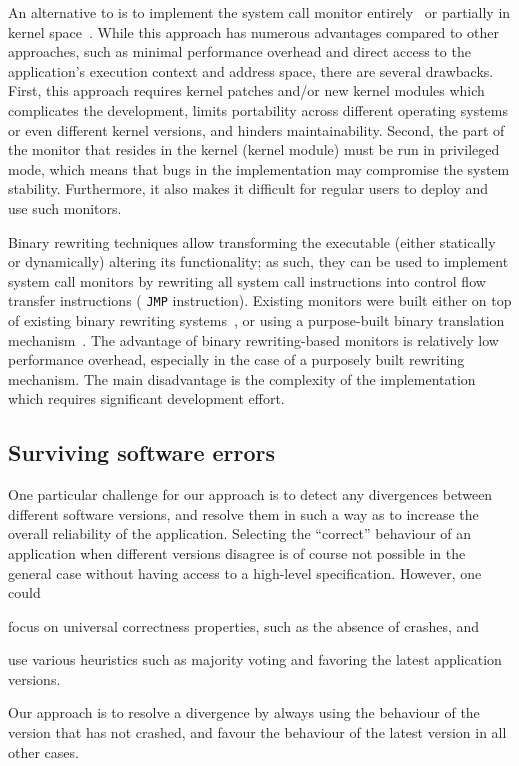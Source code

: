 An alternative to \ptrace is to implement the system call monitor
entirely~\cite{provos2002,cox2006} or partially in kernel space~\cite{ostia}.
While this approach has numerous advantages compared to other approaches, such
as minimal performance overhead and direct access to the application's
execution context and address space, there are several drawbacks.  First, this
approach requires kernel patches and/or new kernel modules which complicates
the development, limits portability across different operating systems or even
different kernel versions, and hinders maintainability. Second, the part of the
monitor that resides in the kernel (\ie kernel module) must be run in
privileged mode, which means that bugs in the implementation may compromise the
system stability. Furthermore, it also makes it difficult for regular users to
deploy and use such monitors.

Binary rewriting techniques allow transforming the executable (either statically
or dynamically) altering its functionality; as such, they can be used to
implement system call monitors by rewriting all system call instructions into 
control flow transfer instructions (\eg
\lstinline[language={[x64]Assembler}]`JMP` instruction). Existing monitors were
built either on top of existing binary rewriting
systems~\cite{onlinevalidation}, or using a purpose-built binary translation
mechanism~\cite{vx32}. The advantage of binary rewriting-based monitors is
relatively low performance overhead, especially in the case of a purposely
built rewriting mechanism. The main disadvantage is the complexity of the
implementation which requires significant development effort.

\subsection{Surviving software errors}

One particular challenge for our approach is to detect any divergences between
different software versions, and resolve them in such a way as to increase the
overall reliability of the application.  Selecting the ``correct'' behaviour of
an application when different versions disagree is of course not possible in
the general case without having access to a high-level specification.  However,
one could%
\begin{inparaenum}[(1)]
\item focus on universal correctness properties, such as the absence of
  crashes, and
\item use various heuristics such as majority voting and favoring the latest
  application versions.
\end{inparaenum}
Our approach is to resolve a divergence by always using the behaviour of the
version that has not crashed, and favour the behaviour of the latest version in
all other cases. %

